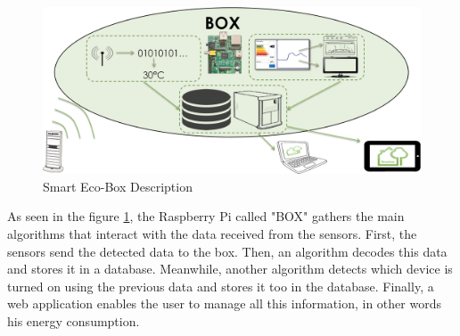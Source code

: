 \begin{figure}[H]
\centering
\includegraphics[scale=0.4]{figures/box.png}
\caption{Smart Eco-Box Description}
\label{fig:boxDescription}
\end{figure}

As seen in the figure \ref{fig:boxDescription}, the Raspberry Pi called "BOX" gathers the main algorithms that interact with the data received from the sensors. First, the sensors send the detected data to the box. Then, an algorithm decodes this data and stores it in a database. Meanwhile, another algorithm detects which device is turned on using the previous data and stores it too in the database. Finally, a web application enables the user to manage all this information, in other words his energy consumption.


